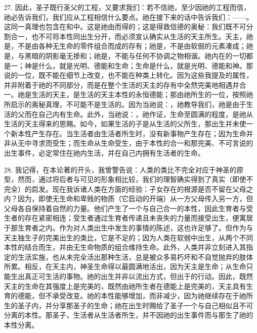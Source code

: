 27. 因此，圣子既行圣父的工程，又要求我们：若不信祂，至少因祂的工程而信，祂必告诉我们，我们应从工程相信什么要点。祂在接下来的话中告诉我们：——。这同一真理也包含在和中。这是祂由而得的；这是得救信德的奥秘：我们既不可分割合一，也不可将本性同出生分开，而必须宣认确实从生活的天主所生。天主，祂是，不是由各种无生命的零件组合而成的存有；祂是，不是由软弱的元素凑成；祂是，与黑暗的阴影毫无掺和；祂是，不能与任何不协调之物相谐。祂内在的一切都是一；神是什么，就是光明、德能和生命；生命是什么，就是光明、德能和神。那说的一位，既不能在细节上改变，也不能在种类上转化。因为这些我提及的属性，并非附着于祂的不同部分，而是在整个生活的天主的存有中全然完美地相遇并合一。祂是生活的天主，是生活的天主本性的永恒德能；那由祂所生的一位，按照祂所启示的奥秘真理，不可能不是生活的。因为当祂说：，祂教导我们，祂是由于生活的父而在自己内有生命。此外，当祂说：，祂作证，生命至圆满的程度，是祂从生活的天主得来的恩赐。如今，如果生活的子是从生活的父所生，那出生并未使一个新本性产生存在。当生活者由生活者所生时，没有新事物产生存在；因为生命并非从无中寻求而受生；而生命从生命受生，由于本性的合一和那完美、不可言说的出生事件，必定常住在祂内生活，并在自己内拥有生活者的生命。\par

28. 我记得，在本论著的开头，我曾警告说：人类的类比不完全对应于神圣的原型，然而，通过将后者与可见的形象相比较，我们的理智确实得到了真实（即使不完全）的启发。现在我诉诸人类在方面的经验：子女存在的根源是否不留在父母之内？因为，即使无生命和卑贱的物质（它启动的开端）从一方父母传入另一方，但父母各自保持着自然的力量。他们产生了一个与自己合一的本性，因此生育者与受生者的存在紧密相连；受生者通过生育者传递且未丧失的力量而接受出生，便寓居于那生育者之内。作为对人类出生中发生的事情的陈述，这也许足够了。但作为与天主独生子的完美出生的类比，它是不足的；因为人类在软弱中出生，从两个不同本性的结合而生，并由无生命物质的组合维持生命。此外，人类并非立刻进入其指定的生活实施，也从未完全活出那种生活，总是被众多易朽坏和不自觉抛弃的肢体所累。相反，在天主内，神圣生命得以最圆满地活出，因为天主是生命；从生命只能生出真正可生活的事物。祂的出生并非以流出方式，但出于的行动。因此，既然天主的生命在其强度上是完美的，既然由祂所生者在德能上是完美的，天主具有生育的德能，但不承受改变。祂的本性能够增加，而非减少，因为祂继续存在于祂所生的圣子内，并分享那圣子的生命；祂在出生时赐给了圣子一个与自己相似且不可分离的本性。那圣子，生活者从生活者所生，并不因祂的出生事件而与那生了祂的本性分离。\par

